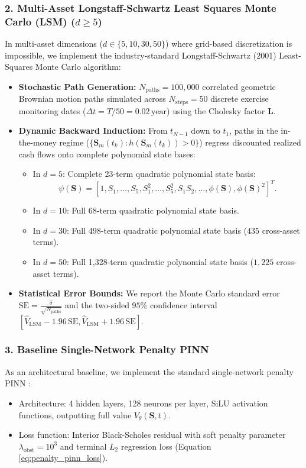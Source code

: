 \documentclass[11pt,a4paper]{article}
\begin{document}
\subsubsection{2. Multi-Asset Longstaff-Schwartz Least Squares Monte Carlo (LSM) \texorpdfstring{($d \ge 5$)}{(d >= 5)}}
In multi-asset dimensions ($d \in \{5, 10, 30, 50\}$) where grid-based discretization is impossible, we implement the industry-standard Longstaff-Schwartz (2001) \cite{longstaff2001valuing} Least-Squares Monte Carlo algorithm:
\begin{itemize}
    \item \textbf{Stochastic Path Generation:} $N_{\text{paths}} = 100,000$ correlated geometric Brownian motion paths simulated across $N_{\text{steps}} = 50$ discrete exercise monitoring dates ($\Delta t = T/50 = 0.02\,\text{year}$) using the Cholesky factor $\mathbf{L}$.
    \item \textbf{Dynamic Backward Induction:} From $t_{N-1}$ down to $t_1$, paths in the in-the-money regime ($\{\mathbf{S}_m(t_k) : h(\mathbf{S}_m(t_k)) > 0\}$) regress discounted realized cash flows onto complete polynomial state bases:
    \begin{itemize}
        \item In $d = 5$: Complete 23-term quadratic polynomial state basis:
        \begin{equation}
        \psi(\mathbf{S}) = [1, S_1, \dots, S_5, S_1^2, \dots, S_5^2, S_1 S_2, \dots, \phi(\mathbf{S}), \phi(\mathbf{S})^2]^T.
        \end{equation}
        \item In $d = 10$: Full 68-term quadratic polynomial state basis.
        \item In $d = 30$: Full 498-term quadratic polynomial state basis ($435$ cross-asset terms).
        \item In $d = 50$: Full 1,328-term quadratic polynomial state basis ($1,225$ cross-asset terms).
    \end{itemize}
    \item \textbf{Statistical Error Bounds:} We report the Monte Carlo standard error $\text{SE} = \frac{\hat{\sigma}}{\sqrt{N_{\text{paths}}}}$ and the two-sided $95\%$ confidence interval $[\hat{V}_{\text{LSM}} - 1.96\,\text{SE}, \hat{V}_{\text{LSM}} + 1.96\,\text{SE}]$.
\end{itemize}

\subsubsection{3. Baseline Single-Network Penalty PINN}
As an architectural baseline, we implement the standard single-network penalty PINN \cite{al2018solving, larios2021neural}:
\begin{itemize}
    \item Architecture: 4 hidden layers, 128 neurons per layer, SiLU activation functions, outputting full value $V_\theta(\mathbf{S}, t)$.
    \item Loss function: Interior Black-Scholes residual with soft penalty parameter $\lambda_{\text{obst}} = 10^3$ and terminal $L_2$ regression loss (Equation \eqref{eq:penalty_pinn_loss}).
\end{itemize}
\end{document}
